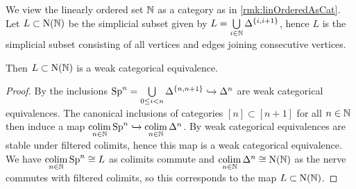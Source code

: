\begin{lemma}\label{lem:spineInclIsWCE}
    We view the linearly ordered set $\mathbb{N}$ as a category as in \cref{rmk:linOrderedAsCat}.
    Let $L\subset\operatorname{N}(\mathbb{N})$ be the simplicial subset given by $L=\bigcup\limits_{i\in\mathbb{N}}\Delta^{\left\lbrace i,i+1\right\rbrace}$, hence $L$ is the simplicial subset consisting of all vertices and edges joining consecutive vertices.
    
    Then $L\subset\operatorname{N}(\mathbb{N})$ is a weak categorical equivalence.
    \begin{proof}
        By \cite[Proposition 3.7.4]{cisinski_2019} the inclusions $\operatorname{Sp}^n=\bigcup\limits_{0\leq i<n}\Delta^{\left\lbrace n,n+1\right\rbrace}\xhookrightarrow{}\Delta^n$ are weak categorical equivalences.
        The canonical inclusions of categories $[n]\subset[n+1]$ for all $n\in\mathbb{N}$ then induce a map $\operatorname*{colim}\limits_{n\in\mathbb{N}}\operatorname{Sp}^n\xhookrightarrow{}\operatorname*{colim}\limits_{n\in\mathbb{N}}\Delta^n$.
        By \cite[Corollary 3.9.8]{cisinski_2019} weak categorical equivalences are stable under filtered colimits, hence this map is a weak categorical equivalence.
        We have $\operatorname*{colim}\limits_{n\in\mathbb{N}}\operatorname{Sp}^n\cong L$ as colimits commute and $\operatorname*{colim}\limits_{n\in\mathbb{N}}\Delta^n\cong\operatorname{N}(\mathbb{N})$ as the nerve commutes with filtered colimits, so this corresponds to the map $L\subset\operatorname{N}(\mathbb{N})$.
    \end{proof}
\end{lemma}
